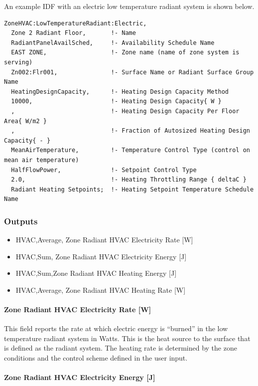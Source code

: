 An example IDF with an electric low temperature radiant system is shown below.

\begin{lstlisting}
ZoneHVAC:LowTemperatureRadiant:Electric,
  Zone 2 Radiant Floor,       !- Name
  RadiantPanelAvailSched,     !- Availability Schedule Name
  EAST ZONE,                  !- Zone name (name of zone system is serving)
  Zn002:Flr001,               !- Surface Name or Radiant Surface Group Name
  HeatingDesignCapacity,      !- Heating Design Capacity Method
  10000,                      !- Heating Design Capacity{ W }
  ,                           !- Heating Design Capacity Per Floor Area{ W/m2 }
  ,                           !- Fraction of Autosized Heating Design Capacity{ - }
  MeanAirTemperature,         !- Temperature Control Type (control on mean air temperature)
  HalfFlowPower,              !- Setpoint Control Type
  2.0,                        !- Heating Throttling Range { deltaC }
  Radiant Heating Setpoints;  !- Heating Setpoint Temperature Schedule Name
\end{lstlisting}

\subsubsection{Outputs}\label{outputs-7-007}

\begin{itemize}
\item
  HVAC,Average, Zone Radiant HVAC Electricity Rate {[}W{]}
\item
  HVAC,Sum, Zone Radiant HVAC Electricity Energy {[}J{]}
\item
  HVAC,Sum,Zone Radiant HVAC Heating Energy {[}J{]}
\item
  HVAC,Average, Zone Radiant HVAC Heating Rate {[}W{]}
\end{itemize}

\paragraph{Zone Radiant HVAC Electricity Rate {[}W{]}}\label{zone-radiant-hvac-electric-power-w}

This field reports the rate at which electric energy is ``burned'' in the low temperature radiant system in Watts. This is the heat source to the surface that is defined as the radiant system. The heating rate is determined by the zone conditions and the control scheme defined in the user input.

\paragraph{Zone Radiant HVAC Electricity Energy {[}J{]}}\label{zone-radiant-hvac-electric-energy-j}

